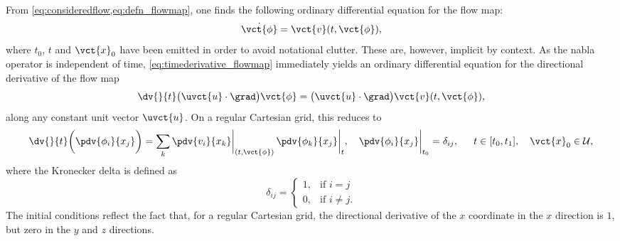 From \cref{eq:consideredflow,eq:defn_flowmap}, one finds the following ordinary
differential equation for the flow map:
\begin{equation}
    \label{eq:timederivative_flowmap}
    \dot{\vct{\phi}} = \vct{v}(t,\vct{\phi}),
\end{equation}
where $t_{0}$, $t$ and $\vct{x}_{0}$ have been emitted in order to avoid
notational clutter. These are, however, implicit by context. As the nabla
operator is independent of time, \cref{eq:timederivative_flowmap} immediately
yields an ordinary differential equation for the directional derivative of the
flow map
\begin{equation}
    \label{eq:timederivative_directionalderivative_flowmap}
    \dv{\phantom{}}{t}\big(\uvct{u}\cdot\grad\big)\vct{\phi} = %
        \big(\uvct{u}\cdot\grad\big)\vct{v}(t,\vct{\phi}),
\end{equation}
along any constant unit vector $\uvct{u}$. On a regular Cartesian grid,
this reduces to
\begin{equation}
    \label{eq:timederivative_flowmap_jacobian}
    \dv{\phantom{}}{t}\bigg(\pdv{\phi_{i}}{x_{j}}\bigg) = %
    \sum\limits_{k} \pdv{v_{i}}{x_{k}}\bigg|_{(t,\vct{\phi})}\,%
                    \pdv{\phi_{k}}{x_{j}}\bigg|_{t}, \quad
    \pdv{\phi_{i}}{x_{j}}\bigg|_{t_{0}} = \delta_{ij}, \quad \hskip0.5em %
    t \in [t_{0},t_{1}], \quad \vct{x}_{0}\in\mathcal{U},
\end{equation}
where the Kronecker delta is defined as
\begin{equation}
    \label{eq:kroneckerdelta}
    \delta_{ij} = %
    \begin{cases}
        1, & \text{if }i=j\\
        0, & \text{if }i\neq{}j.
    \end{cases}
\end{equation}
The initial conditions reflect the fact that, for a regular Cartesian grid,
the directional derivative of the $x$ coordinate in the $x$ direction is $1$,
but zero in the $y$ and $z$ directions.
